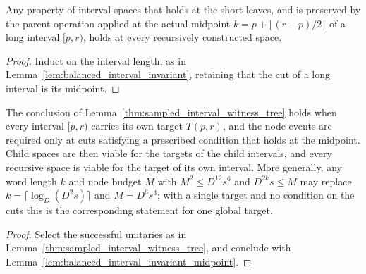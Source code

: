 \begin{lemma}
    \label{lem:balanced_interval_invariant_midpoint}
    \leanok
    Any property of interval spaces that holds at the short leaves, and is
    preserved by the parent operation applied at the actual midpoint
    $k=p+\lfloor(r-p)/2\rfloor$ of a long interval $[p,r)$, holds at every
    recursively constructed space.
\end{lemma}
\begin{proof}\leanok
    Induct on the interval length, as in
    Lemma~\ref{lem:balanced_interval_invariant}, retaining that the cut of
    a long interval is its midpoint.
\end{proof}

\begin{lemma}
    \label{lem:sampled_interval_witness_tree_targets}
    \leanok
    The conclusion of Lemma~\ref{thm:sampled_interval_witness_tree} holds
    when every interval $[p,r)$ carries its own target $T(p,r)$, and the
    node events are required only at cuts satisfying a prescribed condition
    that holds at the midpoint. Child spaces are then viable for the targets
    of the child intervals, and every recursive space is viable for the
    target of its own interval. More generally, any word length $k$ and node
    budget $M$ with $M^2\le D^{12}s^6$ and $D^{2k}s\le M$ may replace
    $k=\lceil\log_D(D^2s)\rceil$ and $M=D^6s^3$; with a single target and no
    condition on the cuts this is the corresponding statement for one global
    target.
\end{lemma}
\begin{proof}\leanok
    Select the successful unitaries as in
    Lemma~\ref{thm:sampled_interval_witness_tree}, and conclude with
    Lemma~\ref{lem:balanced_interval_invariant_midpoint}.
\end{proof}

